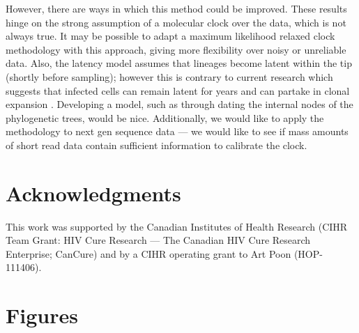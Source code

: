\documentclass[12pt]{article}
\begin{document}
However, there are ways in which this method could be improved. 
These results hinge on the strong assumption of a molecular clock over the data, which is not always true. 
It may be possible to adapt a maximum likelihood relaxed clock methodology with this approach, giving more flexibility over noisy or unreliable data. 
Also, the latency model assumes that lineages become latent within the tip (shortly before sampling); however this is contrary to current research which suggests that infected cells can remain latent for years and can partake in clonal expansion \citep{Maldarelli14}.
Developing a model, such as through dating the internal nodes of the phylogenetic trees, would be {nice}.
Additionally, we would like to apply the methodology to next gen sequence data --- we would like to see if mass amounts of short read data contain sufficient information to calibrate the clock.

\section * {Acknowledgments} \label{sec:ackn}
This work was supported by the Canadian Institutes of Health Research (CIHR Team Grant: HIV Cure Research --- The Canadian HIV Cure Research Enterprise; CanCure) and by a CIHR operating grant to Art Poon (HOP-111406).

\clearpage





\clearpage


\section * {Figures}
\end{document}
